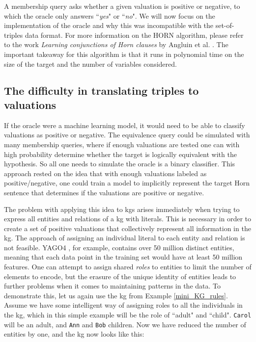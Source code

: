 A membership query asks whether a given valuation is positive or negative, to which the oracle only answers ``\textit{yes}" or ``\textit{no}". We will now focus on the implementation of the oracle and why this was incompatible with the set-of-triples data format. For more information on the HORN algorithm, please refer to the work \textit{Learning conjunctions of Horn clauses} by Angluin et al. \cite{DBLP:journals/ml/AngluinFP92}. The important takeaway for this algorithm is that it runs in polynomial time on the size of the target and the number of variables considered.


\subsection{The difficulty in translating triples to valuations}
If the oracle were a machine learning model, it would need to be able to classify valuations as positive or negative. The equivalence query could be simulated with many membership queries, where if enough valuations are tested one can with high probability determine whether the target is logically equivalent with the hypothesis. So all one needs to simulate the oracle is a binary classifier. This approach rested on the idea that with enough valuations labeled as positive/negative, one could train a model to implicitly represent the target Horn sentence that determines if the valuations are positive or negative. 

The problem with applying this idea to \glspl{kg} arises immediately when trying to express all entities and relations of a \gls{kg} with literals. This is necessary in order to create a set of positive valuations that collectively represent all information in the \gls{kg}. The approach of assigning an individual literal to each entity and relation is not feasible. YAGO4 \cite{yago4}, for example, contains over 50 million distinct entities, meaning that each data point in the training set would have at least 50 million features. One can attempt to assign shared \textit{roles} to entities to limit the number of elements to encode, but the erasure of the unique identity of entities leads to further problems when it comes to maintaining patterns in the data. To demonstrate this, let us again use the \gls{kg} from Example \ref{mini_KG_rules}. Assume we have some intelligent way of assigning roles to all the individuals in the \gls{kg}, which in this simple example will be the role of ``adult" and ``child". \texttt{Carol} will be an adult, and \texttt{Ann} and \texttt{Bob} children. Now we have reduced the number of entities by one, and the \gls{kg} now looks like this:

